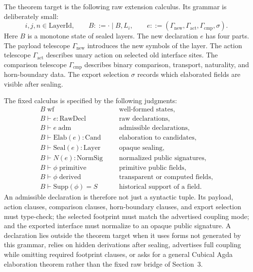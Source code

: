 The theorem target is the following raw extension calculus.  Its grammar is deliberately
small:
\[
  i,j,n \in \mathrm{LayerId},
  \qquad
  B ::= \cdot \mid B,L_i,
  \qquad
  e ::= (\Gamma_{\mathrm{new}},\Gamma_{\mathrm{act}},\Gamma_{\mathrm{cmp}},\sigma).
\]
Here \(B\) is a monotone state of sealed layers.  The new declaration \(e\) has four parts.
The payload telescope \(\Gamma_{\mathrm{new}}\) introduces the new symbols of the layer.  The
action telescope \(\Gamma_{\mathrm{act}}\) describes unary action on selected old interface
sites.  The comparison telescope \(\Gamma_{\mathrm{cmp}}\) describes binary comparison,
transport, naturality, and horn-boundary data.  The export selection \(\sigma\) records which
elaborated fields are visible after sealing.

The fixed calculus is specified by the following judgments:
\[
\begin{array}{rcll}
  B\;\mathrm{wf} &&& \text{well-formed states},\\
  B\vdash e:\mathrm{RawDecl} &&& \text{raw declarations},\\
  B\vdash e\;\mathrm{adm} &&& \text{admissible declarations},\\
  B\vdash \mathrm{Elab}(e):\mathrm{Cand} &&& \text{elaboration to candidates},\\
  B\vdash \mathrm{Seal}(e):\mathrm{Layer} &&& \text{opaque sealing},\\
  B\vdash N(e):\mathrm{NormSig} &&& \text{normalized public signatures},\\
  B\vdash \phi\;\mathrm{primitive} &&& \text{primitive public fields},\\
  B\vdash \phi\;\mathrm{derived} &&& \text{transparent or computed fields},\\
  B\vdash \mathrm{Supp}(\phi)=S &&& \text{historical support of a field}. 
\end{array}
\]
An admissible declaration is therefore not just a syntactic tuple.  Its payload, action
clauses, comparison clauses, horn-boundary clauses, and export selection must type-check;
the selected footprint must match the advertised coupling mode; and the exported interface
must normalize to an opaque public signature.  A declaration lies outside the theorem target
when it uses forms not generated by this grammar, relies on hidden derivations after sealing,
advertises full coupling while omitting required footprint clauses, or asks for a general
Cubical Agda elaboration theorem rather than the fixed raw bridge of Section~3.

